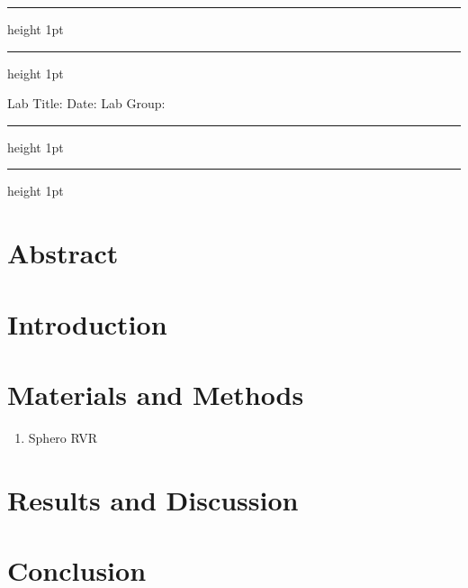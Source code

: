 \documentclass[11 pt , a 4 paper ]{article}
\theoremstyle{definition}
\begin{document}
	\vskip 7pt
	
	{\color{aqua}\hrule height 1pt}
	{\color{grey}\hrule height 1pt}
	
	\vskip 5pt

  Lab Title:
  Date:
  Lab Group:
  {\color{aqua}\hrule height 1pt}
	{\color{grey}\hrule height 1pt}
	
	\vskip 5pt
 

	\section*{Abstract}

  \section*{Introduction}

  \section*{Materials and Methods}
  
  \begin{enumerate}
    \item Sphero RVR
  \end{enumerate}

  \section*{Results and Discussion}

  \section{Conclusion}
\end{document}
